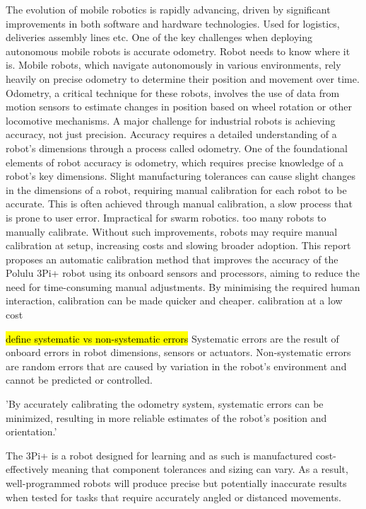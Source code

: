 \documentclass[conference]{IEEEtran}
\begin{document}
The evolution of mobile robotics is rapidly advancing, driven by significant improvements in both software and hardware technologies. 
Used for logistics, deliveries assembly lines etc. 
One of the key challenges when deploying autonomous mobile robots is accurate odometry. Robot needs to know where it is.
Mobile robots, which navigate autonomously in various environments, rely heavily on precise odometry to determine their position and movement over time. 
Odometry, a critical technique for these robots, involves the use of data from motion sensors to estimate changes in position based on wheel rotation or other locomotive mechanisms.
A major challenge for industrial robots is achieving accuracy, not just precision. 
Accuracy requires a detailed understanding of a robot's dimensions through a process called odometry. 
One of the foundational elements of robot accuracy is odometry, which requires precise knowledge of a robot's key dimensions.
Slight manufacturing tolerances can cause slight changes in the dimensions of a robot, requiring manual calibration for each robot to be accurate.
This is often achieved through manual calibration, a slow process that is prone to user error.
Impractical for swarm robotics. too many robots to manually calibrate.
Without such improvements, robots may require manual calibration at setup, increasing costs and slowing broader adoption. 
This report proposes an automatic calibration method that improves the accuracy of the Polulu 3Pi+ robot using its onboard sensors and processors, aiming to reduce the need for time-consuming manual adjustments.
By minimising the required human interaction, calibration can be made quicker and cheaper.
calibration at a low cost

\hl{define systematic vs non-systematic errors}
Systematic errors are the result of onboard errors in robot dimensions, sensors or actuators. Non-systematic errors are random errors that are caused by variation in the robot's environment and cannot be predicted or controlled.

'By accurately calibrating the odometry system, systematic errors can be minimized, resulting in more reliable estimates of the robot’s position and orientation.' \cite{odometry}

The 3Pi+ is a robot designed for learning and as such is manufactured cost-effectively meaning that component tolerances and sizing can vary. As a result, well-programmed robots will produce precise but potentially inaccurate results when tested for tasks that require accurately angled or distanced movements. 
\end{document}
